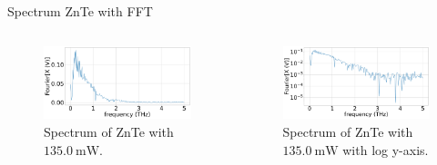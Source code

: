 \documentclass[aspectratio=1610, 9pt]{beamer}
\begin{document}
\begin{frame}{Spectrum ZnTe with FFT}
  \begin{columns}
    \begin{column}{.5\textwidth}
  \begin{figure}
    \includegraphics[width=\textwidth]{images/2_11_30_20normalFX.pdf}
    \caption{\textcolor{tugreen}{Spectrum} of ZnTe with $\SI{135.0}{\milli\W}$.}
  \end{figure}
  \end{column}
  \begin{column}{.5\textwidth}
    \begin{figure}
      \includegraphics[width=\textwidth]{images/2_11_30_20normallog(FX).pdf}
      \caption{\textcolor{tugreen}{Spectrum} of ZnTe with $\SI{135.0}{\milli\W}$ with log y-axis.}
    \end{figure}    
  \end{column}
  \end{columns}
\end{frame}
\end{document}
